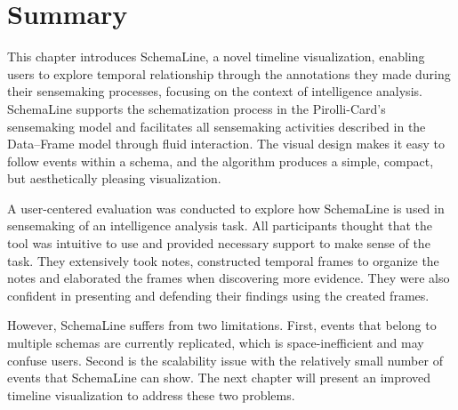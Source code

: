 \section{Summary}
This chapter introduces SchemaLine, a novel timeline visualization, enabling users to explore temporal relationship through the annotations they made during their sensemaking processes, focusing on the context of intelligence analysis. SchemaLine supports the schematization process in the Pirolli-Card's sensemaking model and facilitates all sensemaking activities described in the Data--Frame model through fluid interaction. The visual design makes it easy to follow events within a schema, and the algorithm produces a simple, compact, but aesthetically pleasing visualization. 

A user-centered evaluation was conducted to explore how SchemaLine is used in sensemaking of an intelligence analysis task. All participants thought that the tool was intuitive to use and provided necessary support to make sense of the task. They extensively took notes, constructed temporal frames to organize the notes and elaborated the frames when discovering more evidence. They were also confident in presenting and defending their findings using the created frames.

However, SchemaLine suffers from two limitations. First, events that belong to multiple schemas are currently replicated, which is space-inefficient and may confuse users. Second is the scalability issue with the relatively small number of events that SchemaLine can show. The next chapter will present an improved timeline visualization to address these two problems.